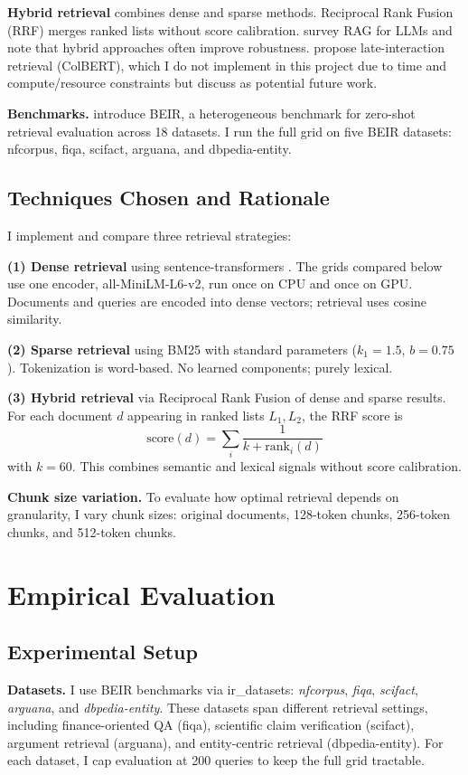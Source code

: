 \documentclass[twoside, 11pt]{article}
\begin{document}
\textbf{Hybrid retrieval} combines dense and sparse methods. Reciprocal Rank Fusion (RRF) merges ranked lists without score calibration. \citet{gao2022rag} survey RAG for LLMs and note that hybrid approaches often improve robustness. \citet{khattab2020colbert} propose late-interaction retrieval (ColBERT), which I do not implement in this project due to time and compute/resource constraints but discuss as potential future work.

\textbf{Benchmarks.} \citet{thakur2021beir} introduce BEIR, a heterogeneous benchmark for zero-shot retrieval evaluation across 18 datasets. I run the full grid on five BEIR datasets: nfcorpus, fiqa, scifact, arguana, and dbpedia-entity.

\subsection{Techniques Chosen and Rationale}
I implement and compare three retrieval strategies:

\textbf{(1) Dense retrieval} using sentence-transformers \citep{reimers2019sentencebert}. The grids compared below use one encoder, all-MiniLM-L6-v2, run once on CPU and once on GPU. Documents and queries are encoded into dense vectors; retrieval uses cosine similarity.

\textbf{(2) Sparse retrieval} using BM25 with standard parameters ($k_1 = 1.5$, $b = 0.75$). Tokenization is word-based. No learned components; purely lexical.

\textbf{(3) Hybrid retrieval} via Reciprocal Rank Fusion of dense and sparse results. For each document $d$ appearing in ranked lists $L_1, L_2$, the RRF score is
$$
\text{score}(d) = \sum_{i} \frac{1}{k + \text{rank}_i(d)}
$$
with $k = 60$. This combines semantic and lexical signals without score calibration.

\textbf{Chunk size variation.} To evaluate how optimal retrieval depends on granularity, I vary chunk sizes: original documents, 128-token chunks, 256-token chunks, and 512-token chunks.

\section{Empirical Evaluation}
\subsection{Experimental Setup}
\textbf{Datasets.} I use BEIR benchmarks via ir\_datasets: \textit{nfcorpus}, \textit{fiqa}, \textit{scifact}, \textit{arguana}, and \textit{dbpedia-entity}. These datasets span different retrieval settings, including finance-oriented QA (fiqa), scientific claim verification (scifact), argument retrieval (arguana), and entity-centric retrieval (dbpedia-entity). For each dataset, I cap evaluation at 200 queries to keep the full grid tractable.
\end{document}
